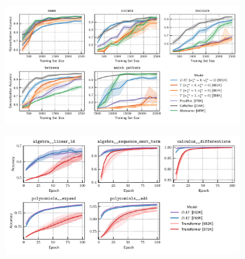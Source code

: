 \documentclass[letterpaper]{article}
\begin{document}
\thispagestyle{empty} %

\begin{figure}
    \centering
    \includegraphics[width=0.8\textwidth]{figs/experiments/relgames/relgames_learning_curves_baseline_comparisons.pdf}
\end{figure}

\begin{figure}
    \centering
    \includegraphics[width=0.8\textwidth]{figs/experiments/math/math_training_curves_interpolation.pdf}
\end{figure}


\end{document}
